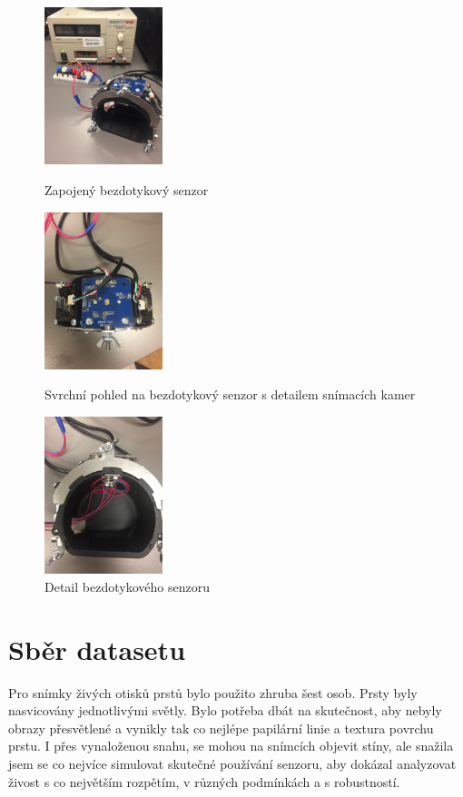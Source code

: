 \begin{figure}[!htbp]
  \begin{minipage}[b]{0.3\linewidth}
    \centering
    \includegraphics[width=130px]{obrazky-figures/IMG_4539.JPG}
    \caption{Zapojený bezdotykový senzor}
  \end{minipage}
  \hspace{0.3cm}
  \begin{minipage}[b]{0.3\linewidth}
    \centering
    \includegraphics[width=130px]{obrazky-figures/IMG_4516.JPG}
    \caption{Svrchní pohled na bezdotykový senzor s detailem snímacích kamer}
  \end{minipage}
  \hspace{0.3cm}
    \begin{minipage}[b]{0.3\linewidth}
    \centering
    \includegraphics[width=130px]{obrazky-figures/IMG_4518.JPG}
    \caption{Detail bezdotykového senzoru}
  \end{minipage}
\end{figure}

\section{Sběr datasetu}
Pro snímky živých otisků prstů bylo použito zhruba šest osob. Prsty byly nasvicovány jednotlivými světly. Bylo potřeba dbát na skutečnost, aby nebyly obrazy přesvětlené a vynikly tak co nejlépe papilární linie a textura povrchu prstu. I přes vynaloženou snahu, se mohou na snímcích objevit stíny, ale snažila jsem se co nejvíce simulovat skutečné používání senzoru, aby dokázal analyzovat živost s co největším rozpětím, v různých podmínkách a s robustností. 


